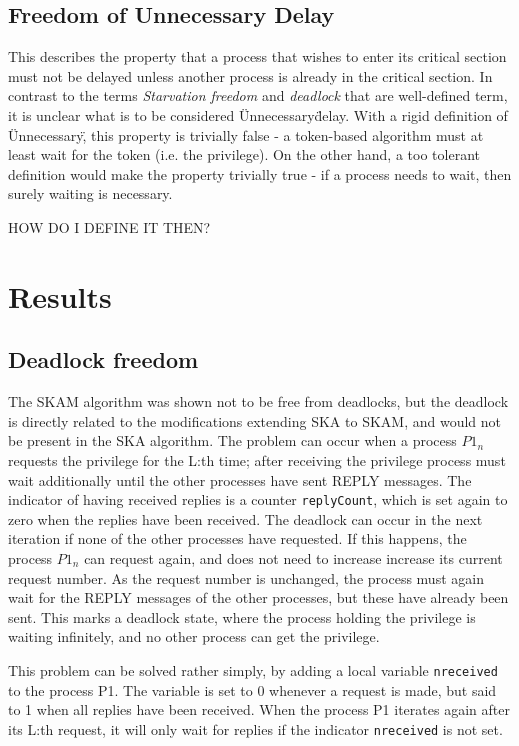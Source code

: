 \documentclass[a4paper,12pt]{article}
\begin{document}
\subsection{Freedom of Unnecessary Delay}
This describes the property that a process that wishes to enter its critical section must not be delayed unless another process is already in the critical section. In contrast to the terms \emph{Starvation freedom} and \emph{deadlock} that are well-defined term, it is unclear what is to be considered \"Unnecessary\" delay. With a rigid definition of \"Unnecessary\", this property is trivially false - a token-based algorithm must at least wait for the token (i.e. the privilege). On the other hand, a too tolerant definition would make the property trivially true - if a process needs to wait, then surely waiting is necessary.

HOW DO I DEFINE IT THEN?

\section{Results}
\subsection{Deadlock freedom}
The SKAM algorithm was shown not to be free from deadlocks, but the deadlock is directly related to the modifications extending SKA to SKAM, and would not be present in the SKA algorithm. The problem can occur when a process $P1_n$ requests the privilege for the L:th time; after receiving the privilege process must wait additionally until the other processes have sent REPLY messages. The indicator of having received replies is a counter \texttt{replyCount}, which is set again to zero when the replies have been received. The deadlock can occur in the next iteration if none of the other processes have requested. If this happens, the process $P1_n$ can request again, and does not need to increase increase its current request number. As the request number is unchanged, the process must again wait for the REPLY messages of the other processes, but these have already been sent. This marks a deadlock state, where the process holding the privilege is waiting infinitely, and no other process can get the privilege.

This problem can be solved rather simply, by adding a local variable \texttt{nreceived} to the process P1. The variable is set to 0 whenever a request is made, but said to 1 when all replies have been received. When the process P1 iterates again after its L:th request, it will only wait for replies if the indicator \texttt{nreceived} is not set.
\end{document}
